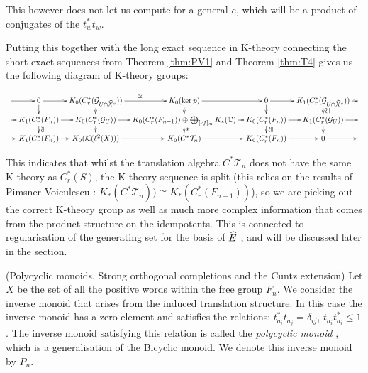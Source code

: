 \begin{example}
This however does not let us compute for a general $e$, which will be a product of conjugates of the $t_{w}^{*}t_{w}$.

Putting this together with the long exact sequence in K-theory connecting the short exact sequences from Theorem \ref{thm:PV1} and Theorem \ref{thm:T4} gives us the following diagram of K-theory groups:

$$
\xymatrix@=0.7em{\ar[r] & 0 \ar[r]\ar[d] & K_{0}(C^{*}_{r}(\G_{U\cap \widehat{X}^{c}}))\ar[d] \ar[r]^{\cong}& K_{0}(\ker p) \ar[r]\ar[d]& 0 \ar[r]\ar[d] & K_{1}(C^{*}_{r}(\G_{U\cap \widehat{X}^{c}})) \ar[r]\ar[d]^{\ucong} &\\
\ar[r] & K_{1}(C^{*}_{r}(F_{n})) \ar[r]\ar[d]^{\ucong} & K_{0}(C^{*}_{r}(\G_{U}))\ar[r]\ar[d]& K_{0}(C^{*}_{r}(F_{n-1})) \oplus \bigoplus_{[ef]_{\approx}} K_{*}(\mathbb{C})\ar[r]\ar[d]^{p}& K_{0}(C^{*}_{r}(F_{n}))\ar[r]\ar[d]^{\ucong} & K_{1}(C^{*}_{r}(\G_{U}))\ar[d] \ar[r] & \\
\ar[r] & K_{1}(C^{*}_{r}(F_{n})) \ar[r]& K_{0}(\mathcal{K}(\ell^{2}(X))) \ar[r]& K_{0}(C^{*}\mathcal{T}_{n}) \ar[r]& K_{0}(C^{*}_{r}(F_{n})) \ar[r]& 0 \ar[r] & 
}
$$

This indicates that whilst the translation algebra $C^{*}\mathcal{T}_{n}$ does not have the same K-theory as $C^{*}_{r}(S)$, the K-theory sequence is split (this relies on the results of Pimsner-Voiculescu \cite{MR670181}: $K_{*}(C^{*}\mathcal{T}_{n}))\cong K_{*}(C^{*}_{r}(F_{n-1}))$), so we are picking out the correct K-theory group as well as much more complex information that comes from the product structure on the idempotents. This is connected to regularisation of the generating set for the basis of $\widehat{E}$ \cite{CEL-2}, and will be discussed later in the section.

\begin{example}(Polycyclic monoids, Strong orthogonal completions and the Cuntz extension)
Let $X$ be the set of all the positive words within the free group $F_{n}$. We consider the inverse monoid that arises from the induced translation structure. In this case the inverse monoid has a zero element and satisfies the relations: $t_{a_{i}}^{*}t_{a_{j}}=\delta_{ij}$, $t_{a_{i}}t_{a_{i}}^{*} \leq 1$. The inverse monoid satisfying this relation is called the \textit{polycyclic monoid} \cite{MR2372319}, which is a generalisation of the Bicyclic monoid. We denote this inverse monoid by $P_{n}$.



\end{example}
\end{example}
